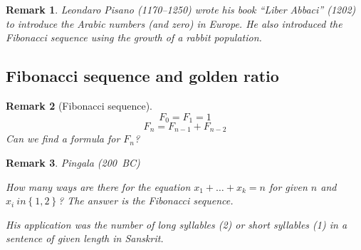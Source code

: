\documentclass{article}
\newtheorem{remark}{Remark}  \numberwithin{remark}{section}
\newcommand{\set}[1]{\left\{#1\right\}}
\begin{document}
\begin{remark}
  Leondaro Pisano (1170--1250) wrote his book \enquote{Liber Abbaci} (1202) to introduce the Arabic numbers (and zero) in Europe.
  He also introduced the Fibonacci sequence using the growth of a rabbit population.
\end{remark}

\subsection{Fibonacci sequence and golden ratio}

\begin{remark}[Fibonacci sequence]
  \[ F_0 = F_1 = 1 \]
  \[ F_n = F_{n-1} + F_{n-2} \]
  Can we find a formula for $F_n$?
\end{remark}

\begin{remark}
  Pingala (200~BC)

  How many ways are there for the equation $x_1 + \dots + x_k = n$ for given $n$ and $x_i \ in \set{1,2}$?
  The answer is the Fibonacci sequence.

  His application was the number of long syllables (2) or short syllables (1) in a sentence of given length in Sanskrit.
\end{remark}
\end{document}
